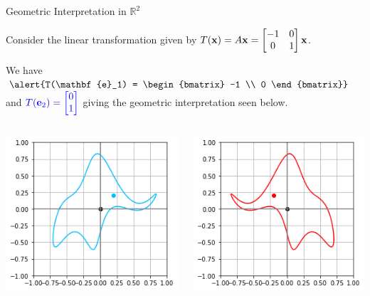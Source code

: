 \documentclass[xcolor=dvipsnames,aspectratio=169,t]{beamer}
\begin{document}
\begin{frame}{Geometric Interpretation in $\mathbb{R}^2$}

Consider the linear transformation given by $\displaystyle T(\mathbf{x}) = A \mathbf{x} = \begin{bmatrix} -1 & 0 \\ 0 & 1 \end{bmatrix}\mathbf{x}$. 

We have  $\dsty \alert{T(\mathbf{e}_1) = \begin{bmatrix} -1 \\ 0 \end{bmatrix}}$ and $\displaystyle \textcolor{blue}{T(\mathbf{e}_2) = \begin{bmatrix} 0 \\ 1 \end{bmatrix}}$ giving the geometric interpretation seen below.

\begin{columns}

\column{0.5\tw}

\begin{center}
\includegraphics[width=0.6\tw]{images/fig-elephant.png}
\end{center}

\column{0.5\tw}

\begin{center}
\includegraphics[width=0.6\tw]{images/fig-ele-reflect.png}
\end{center}

\end{columns}

\end{frame}
\end{document}
